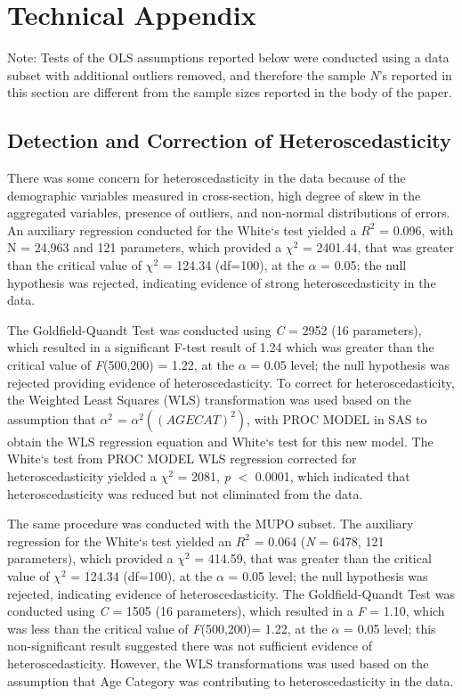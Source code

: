 \documentclass[sigconf]{acmart}
\begin{document}

\appendix

\section{Technical Appendix}

Note: Tests of the OLS assumptions reported below were conducted using 
a data subset with additional outliers removed, and therefore the sample 
\textit{N}'s reported in this section are different from the sample sizes 
reported in the body of the paper.

\subsection{Detection and Correction of Heteroscedasticity}

There was some concern for heteroscedasticity in the data because of the 
demographic variables measured in cross-section, high degree of skew in the 
aggregated variables, presence of outliers, and non-normal distributions of 
errors. An auxiliary regression conducted for the White`s test yielded a 
$R^2$ = 0.096, with N = 24,963 and 121 parameters, which provided a $\chi^2$
= 2401.44, that was greater than the critical value of $\chi^2$ = 124.34 
(df=100), at the $\alpha$ = 0.05; the null hypothesis was rejected, 
indicating evidence of strong heteroscedasticity in the data.  

The Goldfield-Quandt Test was conducted using \textit{C} = 2952 (16 parameters), 
which resulted in a significant F-test result of 1.24 which was greater than 
the critical value of \textit{F}(500,200) = 1.22, at the $\alpha$ = 0.05 level; 
the null hypothesis was rejected providing evidence of heteroscedasticity. 
To correct for heteroscedasticity, the Weighted Least Squares (WLS) 
transformation was used based on the assumption that $\alpha^2$ = 
$\alpha^2((AGECAT)^2)$, with PROC MODEL in SAS to obtain the WLS regression 
equation and White`s test for this new model. The White`s test from PROC 
MODEL WLS regression corrected for heteroscedasticity yielded a $\chi^2$ = 2081, 
\textit{p} $<$ 0.0001, which indicated that heteroscedasticity was reduced but 
not eliminated from the data.

The same procedure was conducted with the MUPO subset. The auxiliary 
regression for the White`s test yielded an $R^2$ = 0.064 (\textit{N} = 6478, 
121 parameters), which provided a $\chi^2$ = 414.59, that was greater than 
the critical value of $\chi^2$ = 124.34 (df=100), at the $\alpha$ = 0.05 level; 
the null hypothesis was rejected, indicating evidence of heteroscedasticity.  
The Goldfield-Quandt Test was conducted using \textit{C} = 1505 (16 parameters), 
which resulted in a \textit{F} = 1.10, which was less than the critical value 
of \textit{F}(500,200)= 1.22, at the $\alpha$ = 0.05 level; this non-significant 
result suggested there was not sufficient evidence of heteroscedasticity. 
However, the WLS transformations was used based on the assumption that 
Age Category was contributing to heteroscedasticity in the data.
\end{document}
